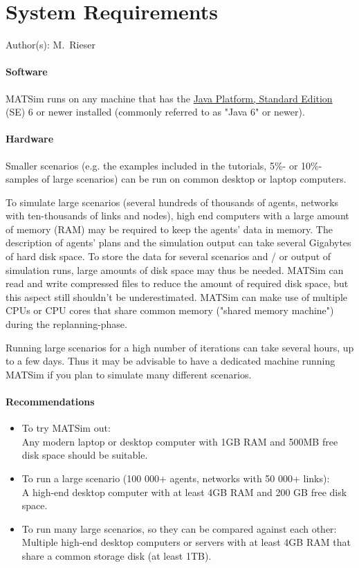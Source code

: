 \chapter{System Requirements}

\centerline{\hfill Author(s): M.\ Rieser}

\bigskip

\subsubsection{Software}

MATSim runs on any machine that has the \href{http://java.sun.com/javase/downloads/index.jsp}{Java Platform, Standard Edition} (SE) 6 or newer installed (commonly referred to as "Java 6" or newer).

\subsubsection{Hardware}

Smaller  scenarios (e.g. the examples included in the tutorials, 5\%- or  10\%-samples of large scenarios) can be run on common desktop or laptop  computers.

To simulate large scenarios (several hundreds of  thousands of agents, networks with ten-thousands of links and nodes),  high end computers with a large amount of memory (RAM) may be required  to keep the agents' data in memory. The description of agents' plans and  the simulation output can take several Gigabytes of hard disk space. To  store the data for several scenarios and / or output of simulation  runs, large amounts of disk space may thus be needed. MATSim can read  and write compressed files to reduce the amount of required disk space,  but this aspect still shouldn't be underestimated. MATSim can make use  of multiple CPUs or CPU cores that share common memory ("shared memory  machine") during the replanning-phase.

Running large scenarios for  a high number of iterations can take several hours, up to a few days.  Thus it may be advisable to have a dedicated machine running MATSim if  you plan to simulate many different scenarios.

\subsubsection{Recommendations}
\begin{itemize}
	\item To try MATSim out:
\\Any modern laptop or desktop computer with 1GB RAM and 500MB free disk space should be suitable.
	\item To run a large scenario (100 000+ agents, networks with 50 000+ links): 
\\A high-end desktop computer with at least 4GB RAM and 200 GB free disk space.
	\item To run many large scenarios, so they can be compared against each other: 
\\Multiple high-end desktop computers or servers with at least 4GB RAM that share a common storage disk (at least 1TB).
\end{itemize}

